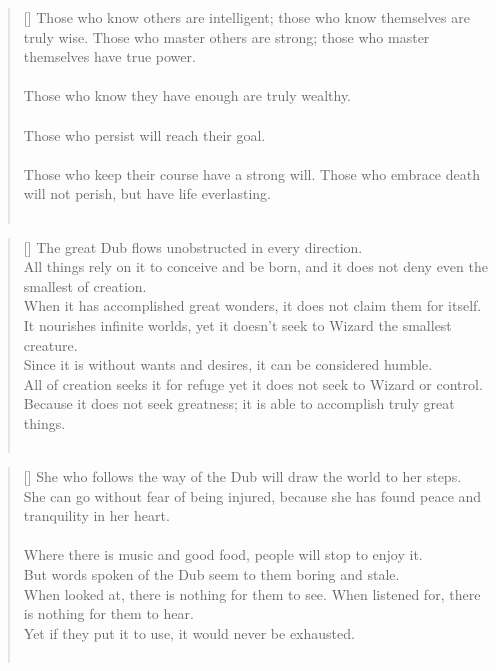 \documentclass{article}
\begin{document}
\settowidth{\versewidth}{The Wizard leads byemptying people’s minds, filling their bellies, weakening their am- bitions, and making them become strong}
\begin{verse}[\versewidth]
Those who know others are intelligent; those who know themselves are truly wise. 
Those who master others are strong; those who master themselves have true power.\\
\hfill\\
Those who know they have enough are truly wealthy.\\
\hfill\\
Those who persist will reach their goal.\\
\hfill\\
Those who keep their course have a strong will. 
Those who embrace death will not perish, but have life everlasting.\\
\hfill\\
\end{verse}

\settowidth{\versewidth}{The Wizard leads byemptying people’s minds, filling their bellies, weakening their am- bitions, and making them become strong}
\begin{verse}[\versewidth]
The great Dub flows unobstructed in every direction.\\
All things rely on it to conceive and be born, and it does not deny even the smallest of creation.\\
When it has accomplished great wonders, it does not claim them for itself.\\
It nourishes infinite worlds, yet it doesn't seek to Wizard the smallest creature.\\
Since it is without wants and desires, it can be considered humble.\\
All of creation seeks it for refuge yet it does not seek to Wizard or control. 
Because it does not seek greatness; it is able to accomplish truly great things.\\
\hfill\\
\end{verse}

\settowidth{\versewidth}{The Wizard leads byemptying people’s minds, filling their bellies, weakening their am- bitions, and making them become strong}
\begin{verse}[\versewidth]
She who follows the way of the Dub will draw the world to her steps.\\
She can go without fear of being injured, because she has found peace and tranquility in her heart.\\
\hfill\\
Where there is music and good food, people will stop to enjoy it.\\
But words spoken of the Dub seem to them boring and stale.\\
When looked at, there is nothing for them to see. 
When listened for, there is nothing for them to hear.\\
Yet if they put it to use, it would never be exhausted.\\
\hfill\\
\end{verse}
\end{document}
